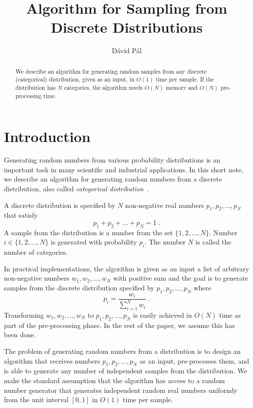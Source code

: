 \documentclass{article}
\title{Algorithm for Sampling from Discrete Distributions}
\author{D\'avid P\'al}
\begin{document}
\maketitle

\begin{abstract}
We describe an algorithm for generating random samples from any discrete
(categorical) distribution, given as an input, in $O(1)$ time per sample.  If
the distribution has $N$ categories, the algorithm needs $O(N)$ memory and
$O(N)$ pre-processing time.
\end{abstract}

\section{Introduction}
\label{section:introduction}

Generating random numbers from various probability distributions is an
important task in many scientific and industrial applications. In this short
note, we describe an algorithm for generating random numbers from a discrete
distribution, also called \emph{categorical
distribution}~\cite{wikipedia:categorical_distribution}.

A discrete distribution is specified by $N$ non-negative real numbers
$p_1, p_2, \dots, p_N$ that satisfy
$$
p_1 + p_2 + \dots + p_N = 1 \; .
$$
A sample from the distribution is a number from the set $\{1,2,\dots,N\}$.
Number $i \in \{1,2,\dots,N\}$ is generated with probability $p_i$.  The number
$N$ is called the number of categories.

In practical implementations, the algorithm is given as an input
a list of arbitrary non-negative numbers $w_1, w_2, \dots, w_N$
with positive sum and the goal is to generate samples from the discrete
distribution specified by $p_1, p_2, \dots, p_N$ where
$$
p_i = \frac{w_i}{\sum_{i=1}^N w_i} \; .
$$
Transforming $w_1, w_2, \dots, w_N$ to $p_1, p_2, \dots, p_N$ is easily
achieved in $O(N)$ time as part of the pre-processing phase.  In the rest of
the paper, we assume this has been done.

The problem of generating random numbers from a distribution is to design an
algorithm that receives numbers $p_1, p_2, \dots, p_N$ as an input,
pre-processes them, and is able to generate any number of independent samples
from the distribution. We make the standard assumption that the algorithm has
access to a random number generator that generates independent random real
numbers uniformly from the unit interval $[0,1]$ in $O(1)$ time per sample.
\end{document}
